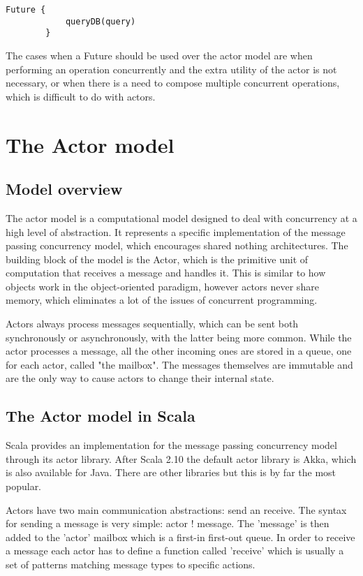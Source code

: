 \documentclass[12pt]{article}
\begin{document}
	\begin{lstlisting}[style=myScalastyle, caption={Wrapping blocking operations with Futures to increase scalability}, label={wrapBlocking}]
		Future {
			queryDB(query)
		}
	\end{lstlisting}

	The cases when a Future should be used over the actor model are when performing an 
	operation concurrently and the extra utility of the actor is not necessary, or when 
	there is a need to compose multiple concurrent operations, which is difficult to do 
	with actors\cite{ScalaInAction}. 

	\section{The Actor model}
	\subsection{Model overview}
	The actor model is a computational model designed to deal with concurrency at a high 
	level of abstraction\cite{ProgrammingInScala}. It represents a specific implementation 
	of the message passing concurrency model, which encourages shared nothing architectures.
	The building block of the model is the Actor, 
	which is the primitive unit of computation that receives a message and handles it.
	This is similar to how objects work in the object-oriented paradigm, however actors 
	never share memory, which eliminates a lot of the issues of concurrent programming.

	Actors always process messages sequentially, which can be sent both synchronously or 
	asynchronously, with the latter being more common\cite{ScalaInAction}. While the actor 
	processes a message, all the other incoming ones are stored in a queue, one for each 
	actor, called "the mailbox". The messages themselves are immutable and are the only 
	way to cause actors to change their internal state.

	\subsection{The Actor model in Scala}
	Scala provides an implementation for the message passing concurrency model through its 
	actor library\cite{ScalaInAction}. After Scala 2.10 the default actor library is Akka, which is also 
	available for Java. There are other libraries but this is by far the most popular. 

	Actors have two main communication abstractions: send an receive. The syntax for 
	sending a message is very simple: actor ! message. The 'message' is then added to
	the 'actor' mailbox which is a first-in first-out queue. In order to receive a message 
	each actor has to define a function called 'receive' which is usually a set of patterns 
	matching message types to specific actions.
	
\end{document}
